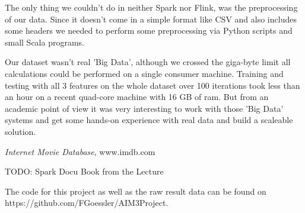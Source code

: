 \documentclass{vldb}
\begin{document}
\par The only thing we couldn't do in neither Spark nor Flink, was the preprocessing of our data. Since it doesn't come in a simple format like CSV and also includes some headers we needed to perform some preprocessing via Python scripts and small Scala programs. 
\par Our dataset wasn't real 'Big Data', although we crossed the giga-byte limit all calculations could be performed on a single consumer machine. Training and testing with all 3 features on the whole dataset over 100 iterations took less than an hour on a recent quad-core machine with 16 GB of ram. But from an academic point of view it was very interesting to work with those 'Big Data' systems and get some hands-on experience with real data and build a scaleable solution.


\begin{thebibliography}{9} 
 \emph{Internet Movie Database}, www.imdb.com
\end{thebibliography}

TODO:
Spark Docu
Book from the Lecture

\bigskip
\par The code for this project as well as the raw result data can be found on https://github.com/FGoessler/AIM3Project.
\end{document}
